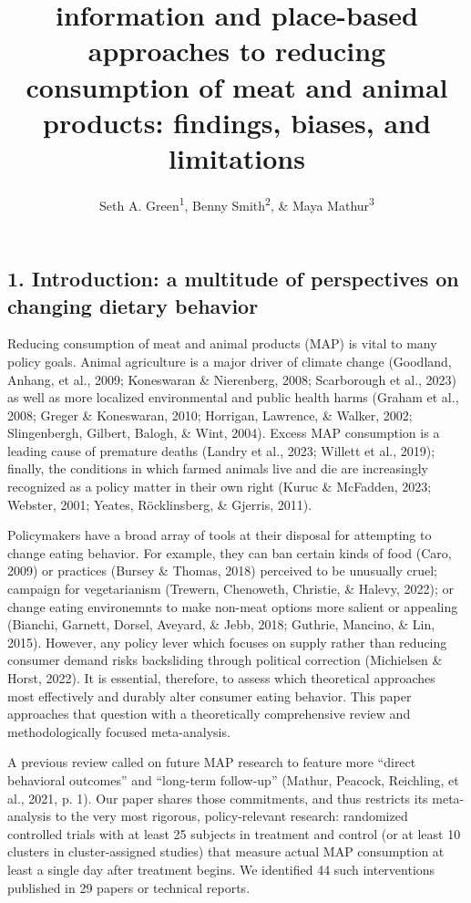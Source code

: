 \documentclass[
  man]{apa6}
\title{information and place-based approaches to reducing consumption of meat and animal products: findings, biases, and limitations}
\author{Seth A. Green\textsuperscript{1}, Benny Smith\textsuperscript{2}, \& Maya Mathur\textsuperscript{3}}
\date{}
\affiliation{\vspace{0.5cm}\textsuperscript{1} Kahneman-Treisman Center, Princeton University\\\textsuperscript{2} Allied Scholars for Animal Protection\\\textsuperscript{3} Stanford University}
\begin{document}
\maketitle

\subsection{1. Introduction: a multitude of perspectives on changing dietary behavior}\label{introduction-a-multitude-of-perspectives-on-changing-dietary-behavior}

Reducing consumption of meat and animal products (MAP) is vital to many policy goals. Animal agriculture is a major driver of climate change (Goodland, Anhang, et al., 2009; Koneswaran \& Nierenberg, 2008; Scarborough et al., 2023) as well as more localized environmental and public health harms (Graham et al., 2008; Greger \& Koneswaran, 2010; Horrigan, Lawrence, \& Walker, 2002; Slingenbergh, Gilbert, Balogh, \& Wint, 2004). Excess MAP consumption is a leading cause of premature deaths (Landry et al., 2023; Willett et al., 2019); finally, the conditions in which farmed animals live and die are increasingly recognized as a policy matter in their own right (Kuruc \& McFadden, 2023; Webster, 2001; Yeates, Röcklinsberg, \& Gjerris, 2011).

Policymakers have a broad array of tools at their disposal for attempting to change eating behavior. For example, they can ban certain kinds of food (Caro, 2009) or practices (Bursey \& Thomas, 2018) perceived to be unusually cruel; campaign for vegetarianism (Trewern, Chenoweth, Christie, \& Halevy, 2022); or change eating environemnts to make non-meat options more salient or appealing (Bianchi, Garnett, Dorsel, Aveyard, \& Jebb, 2018; Guthrie, Mancino, \& Lin, 2015). However, any policy lever which focuses on supply rather than reducing consumer demand risks backsliding through political correction (Michielsen \& Horst, 2022). It is essential, therefore, to assess which theoretical approaches most effectively and durably alter consumer eating behavior. This paper approaches that question with a theoretically comprehensive review and methodologically focused meta-analysis.

A previous review called on future MAP research to feature more ``direct behavioral outcomes'' and ``long-term follow-up'' (Mathur, Peacock, Reichling, et al., 2021, p. 1). Our paper shares those commitments, and thus restricts its meta-analysis to the very most rigorous, policy-relevant research: randomized controlled trials with at least 25 subjects in treatment and control (or at least 10 clusters in cluster-assigned studies) that measure actual MAP consumption at least a single day after treatment begins. We identified 44 such interventions published in 29 papers or technical reports.
\end{document}

